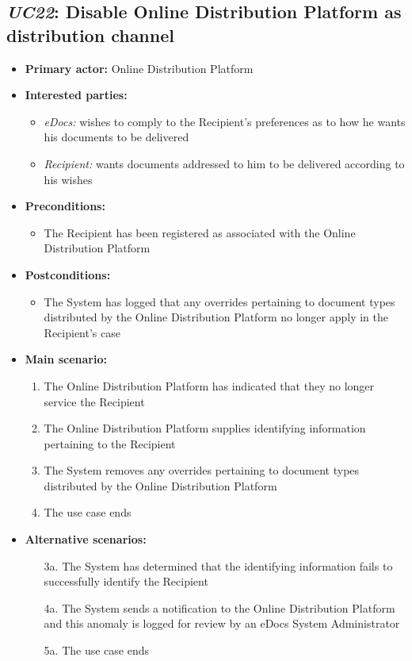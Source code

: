 \documentclass[a4paper,10pt]{article}
\begin{document}
\subsection{\emph{UC22}: Disable Online Distribution Platform as distribution channel}
\begin{itemize}
	\item \textbf{Primary actor:} Online Distribution Platform
	\item \textbf{Interested parties:} 
	\begin{itemize}
		\item \textit{eDocs:} wishes to comply to the Recipient's preferences as to how he wants his documents to be delivered
		\item \textit{Recipient:} wants documents addressed to him to be delivered according to his wishes
	\end{itemize}
	
	\item \textbf{Preconditions:}
	\begin{itemize}
		\item The Recipient has been registered as associated with the Online Distribution Platform
	\end{itemize}
	
	\item \textbf{Postconditions:}
	\begin{itemize}
		\item The System has logged that any overrides pertaining to document types distributed by the Online Distribution Platform no longer apply in the Recipient's case
	\end{itemize}
	
	\item \textbf{Main scenario:} 
	\begin{enumerate}
		\item The Online Distribution Platform has indicated that they no longer service the Recipient
		\item The Online Distribution Platform supplies identifying information pertaining to the Recipient
		\item The System removes any overrides pertaining to document types distributed by the Online Distribution Platform
		\item The use case ends
	\end{enumerate}
	
	\item \textbf{Alternative scenarios:} 
	\begin{enumerate}
		\item [3a.] The System has determined that the identifying information fails to successfully identify the Recipient
		\item [4a.] The System sends a notification to the Online Distribution Platform and this anomaly is logged for review by an eDocs System Administrator
		\item [5a.] The use case ends
	\end{enumerate}
	

\end{itemize}
\end{document}
